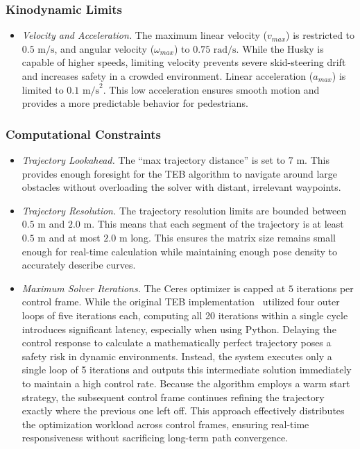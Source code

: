\subsubsection{Kinodynamic Limits}
\label{subsubsec:kinodynamic-limits}
\begin{itemize}
    \item \textit{Velocity and Acceleration.} The maximum linear velocity ($v_{max}$) is restricted to $0.5\text{ m/s}$, and angular velocity ($\omega_{max}$) to $0.75\text{ rad/s}$. While the Husky is capable of higher speeds, limiting velocity prevents severe skid-steering drift and increases safety in a crowded environment. Linear acceleration ($a_{max}$) is limited to $0.1\text{ m/s}^2$. This low acceleration ensures smooth motion and provides a more predictable behavior for pedestrians.
\end{itemize}

\subsubsection{Computational Constraints}
\label{subsubsec:computational-constraints}
\begin{itemize}
    \item \textit{Trajectory Lookahead.} The ``max trajectory distance'' is set to $7\text{ m}$. This provides enough foresight for the TEB algorithm to navigate around large obstacles without overloading the solver with distant, irrelevant waypoints.
    \item \textit{Trajectory Resolution.} The trajectory resolution limits are bounded between $0.5\text{ m}$ and $2.0\text{ m}$. This means that each segment of the trajectory is at least $0.5 \text{ m}$ and at most $2.0\text{ m}$ long. This ensures the matrix size remains small enough for real-time calculation while maintaining enough pose density to accurately describe curves.
    \item \textit{Maximum Solver Iterations.} The Ceres optimizer is capped at $5$ iterations per control frame. While the original TEB implementation~\cite{rosmann2013sparse} utilized four outer loops of five iterations each, computing all 20 iterations within a single cycle introduces significant latency, especially when using Python. Delaying the control response to calculate a mathematically perfect trajectory poses a safety risk in dynamic environments. Instead, the system executes only a single loop of 5 iterations and outputs this intermediate solution immediately to maintain a high control rate. Because the algorithm employs a warm start strategy, the subsequent control frame continues refining the trajectory exactly where the previous one left off. This approach effectively distributes the optimization workload across control frames, ensuring real-time responsiveness without sacrificing long-term path convergence.
\end{itemize}

